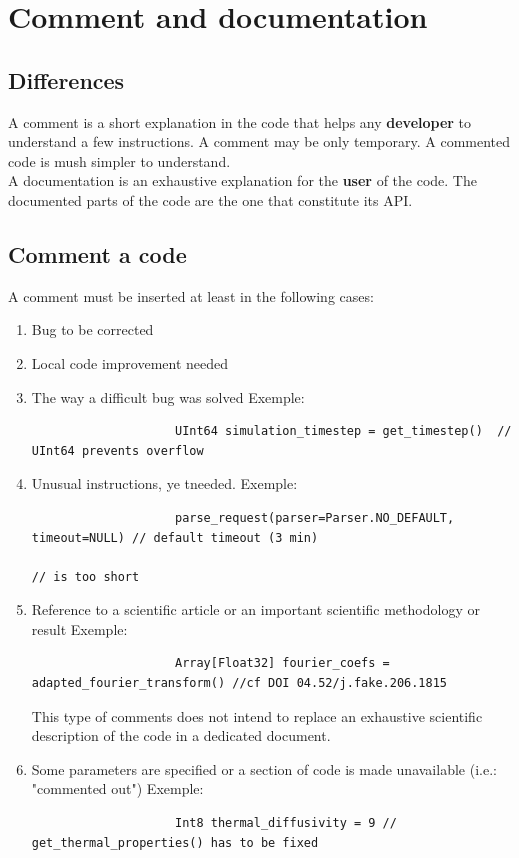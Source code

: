 \documentclass[11pt]{article}
\begin{document}
	\section{Comment and documentation}
		\label{sec:commenter}

		\subsection{Differences}
			A comment is a short explanation in the code that helps any \textbf{developer} to understand a few instructions. A comment may be only temporary.
            A commented code is mush simpler to understand. \\

			A documentation is an exhaustive explanation for the \textbf{user} of the code. The documented parts of the code are the one that constitute its API.

		\subsection{Comment a code}
			A comment must be inserted at least in the following cases:
			\begin{enumerate}
				\setlength\itemsep{0pt}
				\item \label{itm:fixme} Bug to be corrected
				\item \label{itm:todo} Local code improvement needed
				\item The way a difficult bug was solved
				Exemple:
				\begin{verbatim}
					UInt64 simulation_timestep = get_timestep()  // UInt64 prevents overflow
				\end{verbatim}
				\item Unusual instructions, ye tneeded.
				Exemple:
				\begin{verbatim}
					parse_request(parser=Parser.NO_DEFAULT, timeout=NULL) // default timeout (3 min) 
					                                                      // is too short
				\end{verbatim}
				\item Reference to a scientific article or an important scientific methodology or result
				Exemple:
				\begin{verbatim}
					Array[Float32] fourier_coefs = adapted_fourier_transform() //cf DOI 04.52/j.fake.206.1815
				\end{verbatim}
				This type of comments does not intend to replace an exhaustive scientific description of the code in a dedicated document.
				\item Some parameters are specified or a section of code is made unavailable (i.e.: "commented out")
				Exemple:
				\begin{verbatim}
					Int8 thermal_diffusivity = 9 // get_thermal_properties() has to be fixed
				\end{verbatim}
			\end{enumerate}
\end{document}
